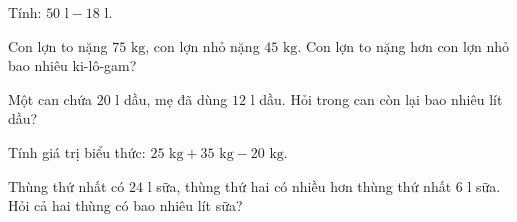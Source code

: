 \begin{ex} %
Tính: $50\text{ l} - 18\text{ l}$.
\end{ex}

\begin{ex} %
Con lợn to nặng $75\text{ kg}$, con lợn nhỏ nặng $45\text{ kg}$. Con lợn to nặng hơn con lợn nhỏ bao nhiêu ki-lô-gam?
\end{ex}

\begin{ex} %
Một can chứa $20\text{ l}$ dầu, mẹ đã dùng $12\text{ l}$ dầu. Hỏi trong can còn lại bao nhiêu lít dầu?
\end{ex}

\begin{ex} %
Tính giá trị biểu thức: $25\text{ kg} + 35\text{ kg} - 20\text{ kg}$.
\end{ex}

\begin{ex} %
Thùng thứ nhất có $24\text{ l}$ sữa, thùng thứ hai có nhiều hơn thùng thứ nhất $6\text{ l}$ sữa. Hỏi cả hai thùng có bao nhiêu lít sữa?
\end{ex}
